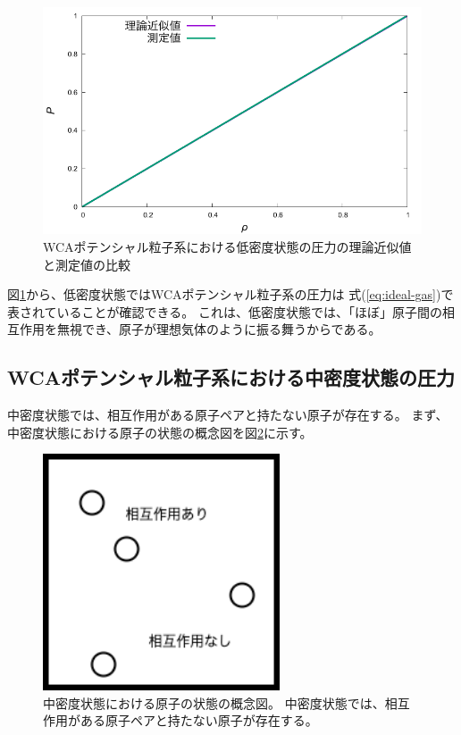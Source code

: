 \documentclass[titlepage]{jsreport}
\begin{document}
{{{\begin{figure}[htbp]
    \begin{center}
        \includegraphics[width=14cm]{fig/lowden_compare:den-pre.pdf}
    \end{center}
    \caption{WCAポテンシャル粒子系における低密度状態の圧力の理論近似値と測定値の比較}
    \label{fig:lowden_compare:den-pre}
\end{figure}

図\ref{fig:lowden_compare:den-pre}から、低密度状態ではWCAポテンシャル粒子系の圧力は
式(\ref{eq:ideal-gas})で表されていることが確認できる。
これは、低密度状態では、「ほぼ」原子間の相互作用を無視でき、原子が理想気体のように振る舞うからである。


\newpage
\subsection{WCAポテンシャル粒子系における中密度状態の圧力}\label{results-subsec:WCA-press-middle-density}
中密度状態では、相互作用がある原子ペアと持たない原子が存在する。
まず、中密度状態における原子の状態の概念図を図\ref{fig:middledensity.png}に示す。

\begin{figure}[htbp]
    \begin{center}
        \includegraphics[width=7cm]{fig/middledensity.png}
    \end{center}
    \caption{中密度状態における原子の状態の概念図。
    中密度状態では、相互作用がある原子ペアと持たない原子が存在する。}
    \label{fig:middledensity.png}
\end{figure}

}}}
\end{document}
